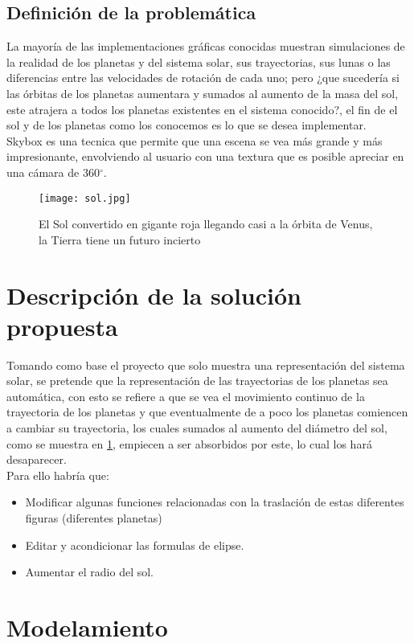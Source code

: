 \documentclass[12pt,journal,compsoc]{IEEEtran}
\begin{document}
\subsection{Definición de la problemática}
La mayoría de las implementaciones gráficas conocidas muestran simulaciones de la realidad de los planetas y del sistema solar, sus trayectorias, sus lunas o las diferencias entre las velocidades de rotación de cada uno; pero ¿que sucedería si las órbitas de los planetas aumentara y sumados al aumento de la masa del sol, este atrajera a todos los planetas existentes en el sistema conocido?, el fin de el sol y de los planetas como los conocemos es lo que se desea implementar.\\
Skybox es una tecnica que permite que una escena se vea más grande y más impresionante, envolviendo al usuario con una textura que es posible apreciar en una cámara de 360$^{\circ}$\cite{skybox2}.
\begin{figure}[h!]
  \texttt{[image: sol.jpg]}
  \caption{El Sol convertido en gigante roja llegando casi a la órbita de Venus, la Tierra tiene un futuro incierto}
  \captionsetup{justification=centering}
  \label{muerte}
\end{figure}
\section{Descripción de la solución propuesta}
Tomando como base el proyecto que solo muestra una representación del sistema solar, se pretende que la representación de las trayectorias de los planetas sea automática, con esto se refiere a que se vea el movimiento continuo de la trayectoria de los planetas y que eventualmente de a poco los planetas comiencen a cambiar su trayectoria, los cuales sumados al aumento del diámetro del sol, como se muestra en \ref{muerte}, empiecen a ser absorbidos por este, lo cual los hará desaparecer\cite{far}.\\
Para ello habría que:
\begin{itemize}
 \item Modificar algunas funciones relacionadas con la traslación de estas diferentes figuras (diferentes planetas)
 \item Editar y acondicionar las formulas de elipse.
 \item Aumentar el radio del sol.
\end{itemize}   %
\section{Modelamiento}
\end{document}
